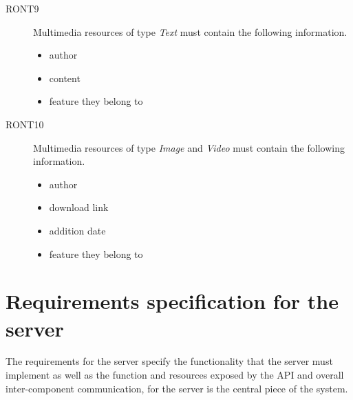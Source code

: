 \begin{description}
\begin{itemize}
\end{itemize}
\item[RONT9] Multimedia resources of type \textit{Text} must contain the following information.
\begin{itemize}
\item author
\item content
\item feature they belong to
\end{itemize}
\item[RONT10] Multimedia resources of type \textit{Image} and \textit{Video} must contain the following information.
\begin{itemize}
\item author
\item download link
\item addition date
\item feature they belong to
\end{itemize}
\end{description}

\section{Requirements specification for the server}

The requirements for the server specify the functionality that the server must implement as well as the function and resources exposed by the API and overall inter-component communication, for the server is the central piece of the system.

